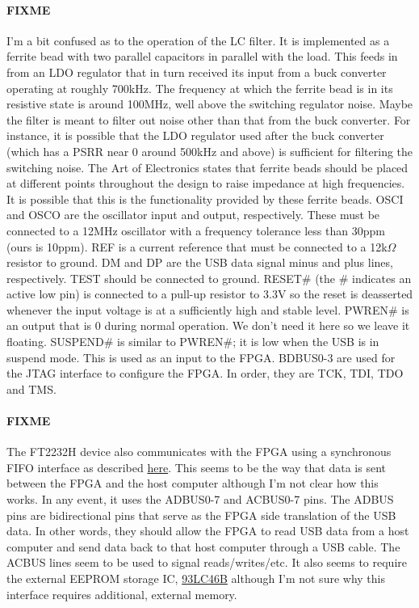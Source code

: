 \documentclass{default}
\begin{document}
\paragraph{FIXME} I'm a bit confused as to the operation of the LC filter. It is implemented as a
ferrite bead with two parallel capacitors in parallel with the load. This feeds in from an LDO
regulator that in turn received its input from a buck converter operating at roughly 700kHz. The
frequency at which the ferrite bead is in its resistive state is around 100MHz, well above the
switching regulator noise. Maybe the filter is meant to filter out noise other than that from the
buck converter. For instance, it is possible that the LDO regulator used after the buck converter
(which has a PSRR near 0 around 500kHz and above) is sufficient for filtering the switching
noise. The Art of Electronics states that ferrite beads should be placed at different points
throughout the design to raise impedance at high frequencies. It is possible that this is the
functionality provided by these ferrite beads.  OSCI and OSCO are the oscillator input and output,
respectively. These must be connected to a 12MHz oscillator with a frequency tolerance less than
30ppm (ours is 10ppm). REF is a current reference that must be connected to a 12k$\Omega$ resistor to
ground. DM and DP are the USB data signal minus and plus lines, respectively. TEST should be
connected to ground. RESET\# (the \# indicates an active low pin) is connected to a pull-up resistor
to 3.3V so the reset is deasserted whenever the input voltage is at a sufficiently high and stable
level. PWREN\# is an output that is 0 during normal operation. We don't need it here so we leave it
floating. SUSPEND\# is similar to PWREN\#; it is low when the USB is in suspend mode. This is used as
an input to the FPGA. BDBUS0-3 are used for the JTAG interface to configure the FPGA. In order, they
are TCK, TDI, TDO and TMS.

\paragraph{FIXME} The FT2232H device also communicates with the FPGA using a synchronous FIFO
interface as described
\href{http://www.ftdichip.com/Support/Documents/AppNotes/AN_130_FT2232H_Used_In_FT245\%20Synchronous\%20FIFO\%20Mode.pdf}{here}. This
seems to be the way that data is sent between the FPGA and the host computer although I'm not
clear how this works. In any event, it uses the ADBUS0-7 and ACBUS0-7 pins. The ADBUS pins
are bidirectional pins that serve as the FPGA side translation of the USB data. In other words,
they should allow the FPGA to read USB data from a host computer and send data back to that host
computer through a USB cable. The ACBUS lines seem to be used to signal reads/writes/etc. It also
seems to require the external EEPROM storage IC,
\href{http://ww1.microchip.com/downloads/en/DeviceDoc/20001749K.pdf}{93LC46B} although I'm not sure
why this interface requires additional, external memory.
\end{document}
